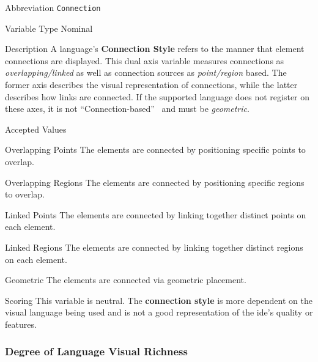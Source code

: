 \begin{AlignedDesc}
  \item[Abbreviation] \texttt{Connection}

  \item[Variable Type] Nominal

  \item[Description] A language's \textbf{Connection Style} refers to the
  manner that element connections are displayed. This dual axis variable
  measures connections as \textit{overlapping/linked} as well as
  connection sources as \textit{point/region} based. The former axis
  describes the visual representation of connections, while the latter
  describes how links are connected. If the supported language does not
  register on these axes, it is not ``Connection-based''~\cite{costagliola2002}
  and must be \textit{geometric}.

  \item[Accepted Values]

  \begin{AlignedDesc}
    \item[Overlapping Points] The elements are connected by positioning
    specific points to overlap.~\cite{costagliola2002}
    \item[Overlapping Regions] The elements are connected by positioning
    specific regions to overlap.~\cite{costagliola2002}
    \item[Linked Points] The elements are connected by linking together
    distinct points on each element.~\cite{costagliola2002}
    \item[Linked Regions] The elements are connected by linking together
    distinct regions on each element.~\cite{costagliola2002}
    \item[Geometric] The elements are connected via geometric placement.~\cite{costagliola2002}
  \end{AlignedDesc}

  \item[Scoring] This variable is neutral. The \textbf{connection style} is
  more dependent on the visual language being used and is not a good
  representation of the \ac{ide}'s quality or features.

\end{AlignedDesc}

\subsubsection{Degree of Language Visual Richness}
\label{subsubsec:languagerichness}

